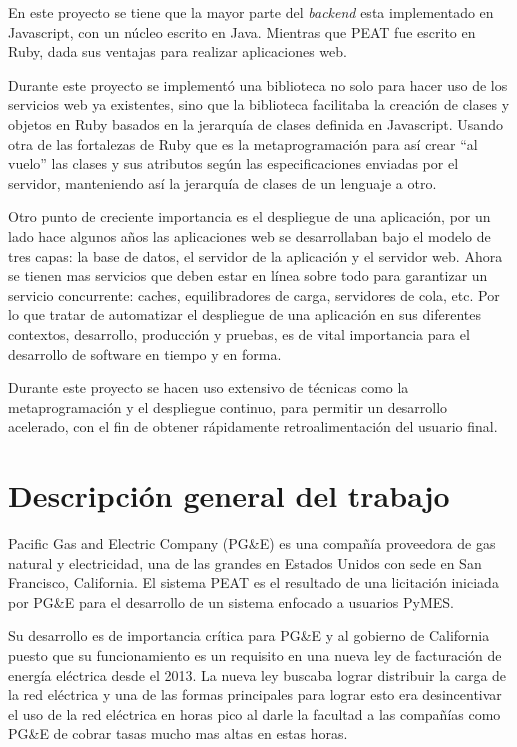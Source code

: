 \documentclass{article}
\begin{document}
En este proyecto se tiene que la mayor parte del \textit{backend} esta implementado
en Javascript, con un núcleo escrito en Java. Mientras que PEAT fue escrito
en Ruby, dada sus ventajas para realizar aplicaciones web.

Durante este proyecto se implementó una biblioteca no solo para hacer uso de
los servicios web ya existentes, sino que la biblioteca facilitaba la creación
de clases y objetos en Ruby basados en la jerarquía de clases definida
en Javascript. Usando otra de las fortalezas de Ruby que es la metaprogramación
para así crear ``al vuelo'' las clases y sus atributos según las especificaciones
enviadas por el servidor, manteniendo así la jerarquía de clases de un lenguaje
a otro.

Otro punto de creciente importancia es el despliegue de una aplicación, por un
lado hace algunos años las aplicaciones web se desarrollaban bajo el modelo de
tres capas: la base de datos, el servidor de la aplicación y el servidor web.
Ahora se tienen mas servicios
que deben estar en línea sobre todo para garantizar un servicio concurrente:
caches, equilibradores de carga, servidores de cola, etc. Por lo que tratar
de automatizar el despliegue de una aplicación en sus diferentes contextos,
desarrollo, producción y pruebas, es de vital importancia para el desarrollo
de software en tiempo y en forma.

Durante este proyecto se hacen uso extensivo de técnicas como la metaprogramación
y el despliegue continuo, para permitir un desarrollo acelerado, con el fin de
obtener rápidamente retroalimentación del usuario final.

\section{Descripción general del trabajo}
Pacific Gas and Electric Company (PG\&E) es una compañía proveedora de gas natural
y electricidad, una de las grandes en Estados Unidos con sede en
San Francisco, California. El sistema PEAT es el resultado de una licitación
iniciada por PG\&E para el desarrollo de un sistema enfocado a usuarios PyMES.

Su desarrollo es de importancia crítica para PG\&E y al gobierno de
California puesto que su funcionamiento es un requisito en una nueva
ley de facturación de energía eléctrica desde el 2013. La nueva ley buscaba
lograr distribuir la carga de la red eléctrica y una de las formas
principales para lograr esto era desincentivar el uso de la red
eléctrica en horas pico al darle la facultad a las compañías como PG\&E
de cobrar tasas mucho mas altas en estas horas.
\end{document}
